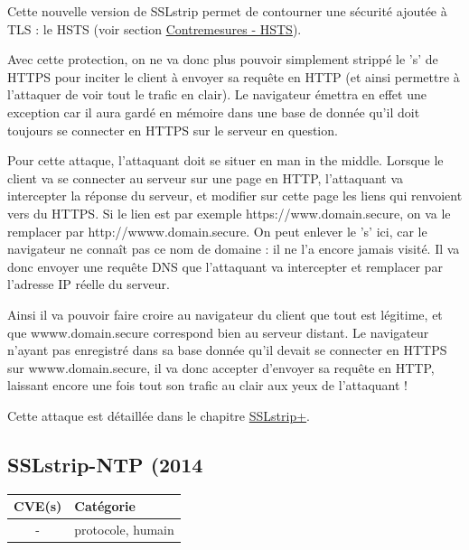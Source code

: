 \vspace{1em}

Cette nouvelle version de SSLstrip permet de contourner une sécurité ajoutée à TLS : le HSTS (voir section \hyperref[sec:hsts]{Contremesures - HSTS}).

Avec cette protection, on ne va donc plus pouvoir simplement strippé le 's' de HTTPS pour inciter le client à envoyer sa requête en HTTP (et ainsi permettre à l'attaquer de voir tout le trafic en clair). Le navigateur émettra en effet une exception car il aura gardé en mémoire dans une base de donnée qu'il doit toujours se connecter en HTTPS sur le serveur en question.

Pour cette attaque, l'attaquant doit se situer en man in the middle. Lorsque le client va se connecter au serveur sur une page en HTTP, l'attaquant va intercepter la réponse du serveur, et modifier sur cette page les liens qui renvoient vers du HTTPS. Si le lien est par exemple https://www.domain.secure, on va le remplacer par http://wwww.domain.secure. On peut enlever le 's' ici, car le navigateur ne connaît pas ce nom de domaine : il ne l'a encore jamais visité. Il va donc envoyer une requête DNS que l'attaquant va intercepter et remplacer par l'adresse IP réelle du serveur.

Ainsi il va pouvoir faire croire au navigateur du client que tout est légitime, et que wwww.domain.secure correspond bien au serveur distant. Le navigateur n'ayant pas enregistré dans sa base donnée qu'il devait se connecter en HTTPS sur wwww.domain.secure, il va donc accepter d'envoyer sa requête en HTTP, laissant encore une fois tout son trafic au clair aux yeux de l'attaquant !

Cette attaque est détaillée dans le chapitre \hyperref[sec:sslstrip2]{SSLstrip+}.


\subsection{SSLstrip-NTP (2014}

\begin{tabularx}{0.96\textwidth}{|c|X|}
  \hline
  \textbf{CVE(s)} & \textbf{Catégorie} \\
  \hline
  - & protocole, humain \\
  \hline
\end{tabularx}

